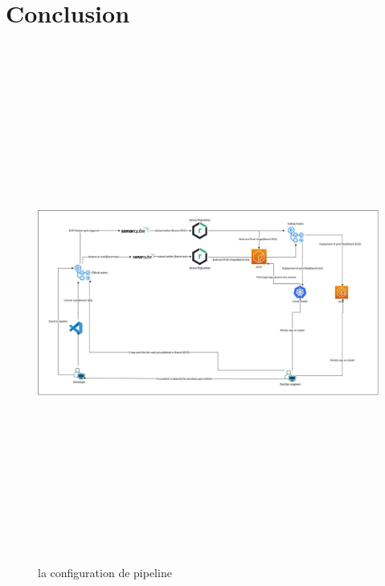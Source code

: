\section{Conclusion}
\newpage
\begin{figure}[H]
    \begin{center}
    \includegraphics[height=17cm,width=18.5cm]{CI_CD EKS.drawio.png}
    \end{center}
    \caption{la configuration de pipeline}
    \end{figure}

